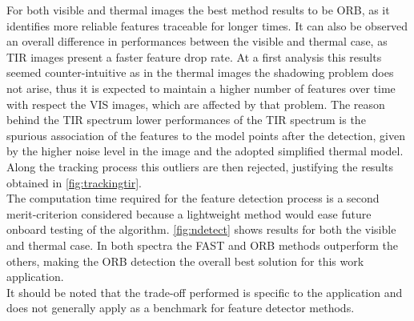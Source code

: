 For both visible and thermal images the best method results to be ORB, as it identifies more reliable features traceable for longer times. It can also be observed an overall difference in performances between the visible and thermal case, as TIR images present a faster feature drop rate. At a first analysis this results seemed counter-intuitive as in the thermal images the shadowing problem does not arise, thus it is expected to maintain a higher number of features over time with respect the VIS images, which are affected by that problem. The reason behind the TIR spectrum lower performances of the TIR spectrum is the spurious association of the features to the model points after the detection, given by the higher noise level in the image and the adopted simplified thermal model. Along the tracking process this outliers are then rejected, justifying the results obtained in \cref{fig:trackingtir}.\\
The computation time required for the feature detection process is a second merit-criterion considered because a lightweight method would ease future onboard testing of the algorithm. \cref{fig:ndetect} shows results for both the visible and thermal case. In both spectra the FAST and ORB methods outperform the others, making the ORB detection the overall best solution for this work application.\\
It should be noted that the trade-off performed is specific to the application and does not generally apply as a benchmark for feature detector methods.


